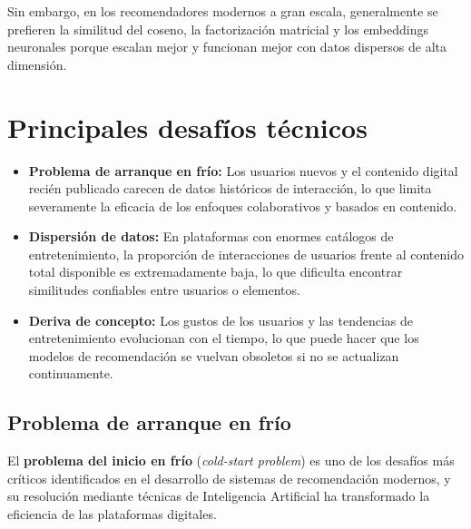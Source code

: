 \documentclass[12pt]{article}
\begin{document}
Sin embargo, en los recomendadores modernos a gran escala, generalmente se prefieren la similitud del coseno, la factorización matricial y los embeddings neuronales porque escalan mejor y funcionan mejor con datos dispersos de alta dimensión.

\section{Principales desafíos técnicos}
\begin{itemize}
\item \textbf{Problema de arranque en frío:} Los usuarios nuevos y el contenido digital recién publicado carecen de datos históricos de interacción, lo que limita severamente la eficacia de los enfoques colaborativos y basados en contenido.
\item \textbf{Dispersión de datos:} En plataformas con enormes catálogos de entretenimiento, la proporción de interacciones de usuarios frente al contenido total disponible es extremadamente baja, lo que dificulta encontrar similitudes confiables entre usuarios o elementos.
\item \textbf{Deriva de concepto:} Los gustos de los usuarios y las tendencias de entretenimiento evolucionan con el tiempo, lo que puede hacer que los modelos de recomendación se vuelvan obsoletos si no se actualizan continuamente.
\end{itemize}

\subsection{Problema de arranque en frío}
El \textbf{problema del inicio en frío} (\emph{cold-start problem}) es uno de los desafíos más críticos identificados en el desarrollo de sistemas de recomendación modernos, y su resolución mediante técnicas de Inteligencia Artificial ha transformado la eficiencia de las plataformas digitales.
\end{document}
